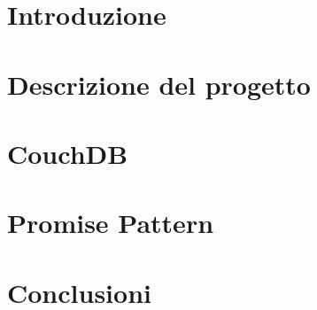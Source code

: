 \thispagestyle{empty} %
\cleardoublepage


\thispagestyle{empty}

\clearpage{\pagestyle{plain}\cleardoublepage}
\tableofcontents


\clearpage{\pagestyle{plain}\cleardoublepage} %

%


\clearpage{\pagestyle{plain}\cleardoublepage}
\chapter{Introduzione}


\clearpage{\pagestyle{plain}\cleardoublepage}
\chapter{Descrizione del progetto}
\label{cha:descrizione}


\clearpage{\pagestyle{plain}\cleardoublepage}
\chapter{CouchDB}
\label{cha:CouchDB}


\clearpage{\pagestyle{plain}\cleardoublepage}
\chapter{Promise Pattern}
\label{cha:analisi_framework}


\clearpage{\pagestyle{plain}\cleardoublepage}
\chapter{Conclusioni}
\label{cha:conclusioni}





